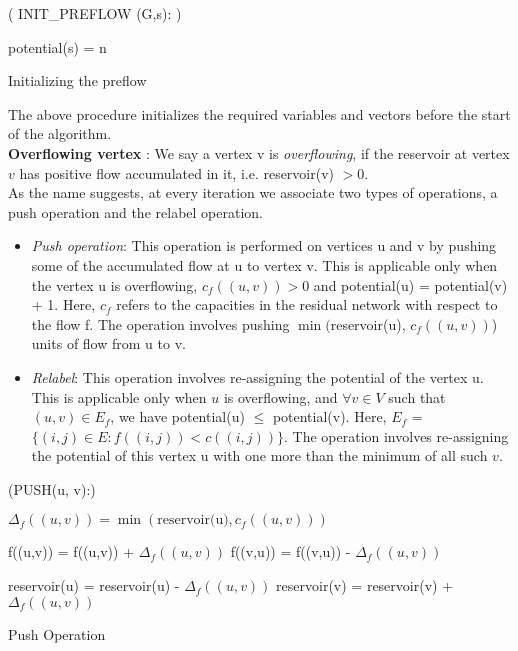 \documentclass[BTech]{iitmdiss}
\begin{document}
	      
	      \begin{algorithm}[H]
	            
	      \Begin( INIT\_PREFLOW {(G,s)}: ){
		
		
		
 		potential(s) = n \;
		
 		\caption{Initializing the preflow}
	    }
	    
	    \end{algorithm}
	      The above procedure initializes the required variables and vectors before the start of the algorithm. \\
	      
	    \textbf{Overflowing vertex} : We say a vertex v is \textit{overflowing}, if the reservoir at vertex $v$ has positive flow accumulated in it,
	    i.e. reservoir(v) $>0$. \\
	    
	    As the name suggests, at every iteration we associate two types of operations, a push operation and the relabel operation.
	    \begin{itemize}
	     \item 
	      \textit{Push operation}: This operation is performed on vertices u and v by pushing some of the accumulated flow at u to vertex v.
	      This is applicable only when the vertex u is overflowing, $c_f((u,v))>0$ and potential(u) = potential(v) + 1. Here, $c_f$ refers to the 
	      capacities in the residual network with respect to the flow f. The operation involves pushing $\min($reservoir(u), $c_f((u,v))$) units of flow
	      from u to v.
	     \item
	      \textit{Relabel}: This operation involves re-assigning the potential of the vertex u. This is applicable only when $u$ is overflowing, and
	      $\forall v \in V$ such that $(u,v) \in E_f$, we have potential(u) $\leq$ potential(v). Here, $E_f$ = $\{(i,j) \in E : f((i,j)) < c((i,j))\}$.
	      The operation involves re-assigning the potential of this vertex u with one more than the minimum of all such $v$.
	    \end{itemize}
	    
	    \begin{algorithm}[H]
	      \Begin(PUSH{(u, v)}:)
	      {
		$\Delta_f((u,v)) = \min(\text{reservoir(u)}, c_f((u,v)))$ \;
		
		\eIf{(u,v) $\in E_f$}
		{
		    f((u,v)) = f((u,v)) + $\Delta_f((u,v))$ \;
		}
		{
		  f((v,u)) = f((v,u)) - $\Delta_f((u,v))$ \;
		}
				
		reservoir(u) = reservoir(u) - $\Delta_f((u,v))$ \;
		reservoir(v) = reservoir(v) + $\Delta_f((u,v))$ \;
	      }
      
	      \caption{Push Operation}
	    \end{algorithm}
	    
\end{document}
